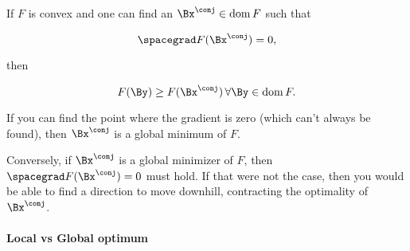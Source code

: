 If \( F \) is convex and one can find an \( \Bx^\conj \in \dom F \) such that

\begin{dmath}\label{eqn:convexOptimizationLecture7:640}
\spacegrad F(\Bx^\conj) = 0,
\end{dmath}

then

\begin{equation}\label{eqn:convexOptimizationLecture7:660}
F(\By) \ge F(\Bx^\conj) \, \forall \By \in \dom F.
\end{equation}

If you can find the point where the gradient is zero (which can't always be found), then \( \Bx^\conj\) is a global minimum of \( F \).

Conversely, if \( \Bx^\conj \) is a global minimizer of \( F \), then \( \spacegrad F(\Bx^\conj) = 0 \) must hold.  If that were not the case, then you would be able to find a direction to move downhill, contracting the optimality of \( \Bx^\conj\).

\paragraph{Local vs Global optimum}




